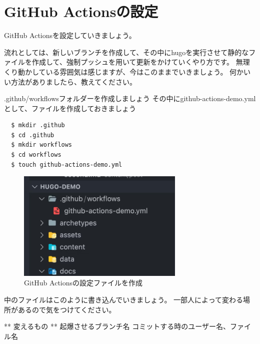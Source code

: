 \chapter{GitHub Actionsの設定}

GitHub Actionsを設定していきましょう。

流れとしては、新しいブランチを作成して、その中にhugoを実行させて静的なファイルを作成して、強制プッシュを用いて更新をかけていくやり方です。
無理くり動かしている雰囲気は感じますが、今はこのままでいきましょう。
何かいい方法がありましたら、教えてください。

.github/workflowsフォルダーを作成しましょう
その中にgithub-actions-demo.ymlとして、ファイルを作成しておきましょう

\begin{shaded}
  \begin{verbatim}
  $ mkdir .github
  $ cd .github
  $ mkdir workflows
  $ cd workflows
  $ touch github-actions-demo.yml
  \end{verbatim}
\end{shaded}

\begin{figure}[H]
  \centering
  \includegraphics[width=8cm]{./image/02-chap8/make-github-workflow.png}
  \caption{GitHub Actionsの設定ファイルを作成 }
  \label{chap8-make-github-workflow-image}
\end{figure}

中のファイルはこのように書き込んでいきましょう。
一部人によって変わる場所があるので気をつけてください。

** 変えるもの **
起爆させるブランチ名 コミットする時のユーザー名、ファイル名

